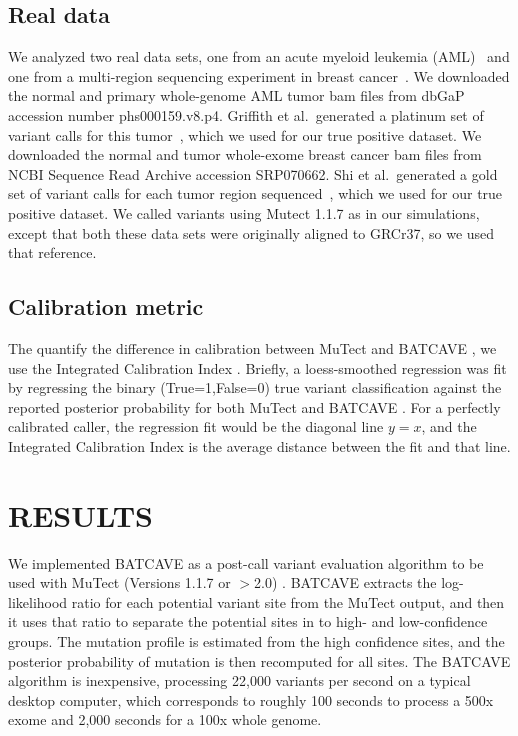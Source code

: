 \documentclass[a4,center,fleqn]{NAR}
\newcommand{\batcave}{BATCAVE }
\begin{document}
\subsection{Real data}
We analyzed two real data sets, one from an acute myeloid leukemia (AML)~\cite{Griffith2015} and one from a multi-region sequencing experiment in breast cancer~\cite{Shi2018}.
We downloaded the normal and primary whole-genome AML tumor bam files from dbGaP accession number phs000159.v8.p4.
Griffith et al.\ generated a platinum set of variant calls for this tumor~\cite{Griffith2015}, which we used for our true positive dataset.
We downloaded the normal and tumor whole-exome breast cancer bam files from NCBI Sequence Read Archive accession SRP070662.
Shi et al.\ generated a gold set of variant calls for each tumor region sequenced~\cite{Shi2018}, which we used for our true positive dataset.
We called variants using Mutect 1.1.7 as in our simulations, except that both these data sets were originally aligned to GRCr37, so we used that reference.

\subsection{Calibration metric}
The quantify the difference in calibration between MuTect and \batcave, we use the Integrated Calibration Index \cite{Austin2019}.
Briefly, a loess-smoothed regression was fit by regressing the binary (True=1,False=0) true variant classification against the reported posterior probability for both MuTect and \batcave.
For a perfectly calibrated caller, the regression fit would be the diagonal line $y=x$, and the Integrated Calibration Index is the average distance between the fit and that line.


\section{RESULTS}
We implemented \batcave as a post-call variant evaluation algorithm to be used with MuTect (Versions 1.1.7 or $>$2.0) \cite{Cibulskis2013}.
\batcave extracts the log-likelihood ratio for each potential variant site from the MuTect output, and then it uses that ratio to separate the potential sites in to high- and low-confidence groups.
The mutation profile is estimated from the high confidence sites, and the posterior probability of mutation is then recomputed for all sites.
The \batcave algorithm is inexpensive, processing 22,000 variants per second on a typical desktop computer, which corresponds to roughly 100 seconds to process a 500x exome and 2,000 seconds for a 100x whole genome.
\end{document}
